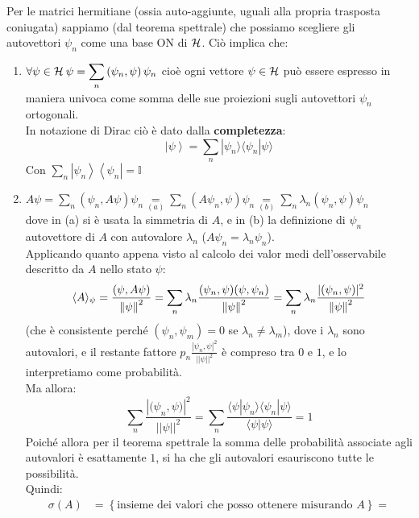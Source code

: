 Per le matrici hermitiane (ossia auto-aggiunte, uguali alla propria trasposta coniugata) sappiamo (dal teorema spettrale) che possiamo scegliere gli autovettori $\psi_n$ come una base ON di $\mathcal{H}$. Ciò implica che:
\begin{enumerate}
    \item $\displaystyle \forall \psi \in \mathcal{H} \> \psi = \sum_{n}{\left(\psi_n, \psi\right)\psi_n}$
    cioè ogni vettore $\psi \in \mathcal{H}$ può essere espresso in maniera univoca come somma delle sue proiezioni sugli autovettori $\psi_n$ ortogonali.\\
    In notazione di Dirac ciò è dato dalla \textbf{completezza}:
    \[
	\left|\psi\right\rangle=\sum_{n}{|\psi_n\rangle \langle\psi_n|\psi\rangle }
	\]
	Con $\sum_{n}{\left|\psi_n\right\rangle\left\langle\psi_n\right|=\mathbb{I}}$
	\item $\displaystyle A\psi = \sum_{n}{\left(\psi_n, A\psi\right)\psi_n \underset{(a)}{=} \sum_{n}{\left(A\psi_n, \psi\right)\psi_n \underset{(b)}{=}\sum_{n}{\lambda_n\left(\psi_n, \psi\right)\psi_n}}}$\\
	dove in (a) si è usata la simmetria di $A$, e in (b) la definizione di $\psi_n$ autovettore di $A$ con autovalore $\lambda_n$ ($A\psi_n = \lambda_n \psi_n$).\\
	Applicando quanto appena visto al calcolo dei valor medi dell'osservabile descritto da $A$ nello stato $\psi$:
	\[
	\langle A \rangle_\psi = \frac{(\psi,A\psi)}{\left\lVert\psi\right\rVert^2} = \sum_n \lambda_n \frac{(\psi_n, \psi)(\psi, \psi_n)}{\left\lVert\psi\right\rVert^2} = \sum_n \lambda_n \frac{|(\psi_n, \psi)|^2}{\left\lVert\psi\right\rVert^2}
	\]
	(che è consistente perché $\left(\psi_n, \psi_m\right)=0$ se $\lambda_n\neq \lambda_m$), dove i $\lambda_n$ sono autovalori, e il restante fattore $\displaystyle p_n \frac{\left|\psi_n,\psi\right|^2}{\left|\left|\psi\right|\right|^2}$ è compreso tra $0$ e $1$, e lo interpretiamo come probabilità.\\
	Ma allora:
	\[
	\sum_{n}{\frac{\left|{(\psi}_n, \psi)\right|^2}{\left|\left|\psi\right|\right|^2}=\sum_{n}\frac{\langle\psi|\psi_n\rangle \langle\psi_n|\psi\rangle }{\langle\psi|\psi\rangle }=1 }
	\]
	Poiché allora per il teorema spettrale la somma delle probabilità associate agli autovalori è esattamente $1$, si ha che gli autovalori esauriscono tutte le possibilità.\\
	Quindi:
	\begin{align*}
	    \sigma \left(A\right)&=\left\{\text {insieme dei valori che posso ottenere misurando } A\right\}= \\

\end{align*}
\end{enumerate}
